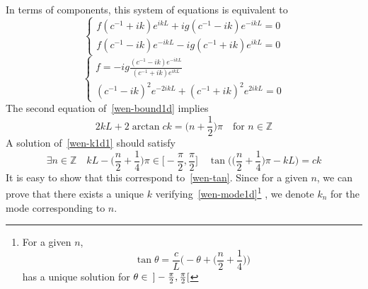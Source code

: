 In terms of components, this system of equations is equivalent to
\begin{equation*}
\begin{cases}
f(c^{-1} + ik)e^{ikL} + ig(c^{-1} - ik)e^{-ikL} = 0 \\
f(c^{-1} - ik)e^{-ikL} - ig(c^{-1}+ ik) e^{ikL} = 0
\end{cases}
\end{equation*}
\ie
\begin{equation}\label{wen-bound1d}
\begin{cases}
f = -ig \frac{(c^{-1} - ik)e^{-ikL}}{(c^{-1} + ik) e^{ikL}} \\
%
(c^{-1} - ik)^2 e^{-2ikL} + (c^{-1}+ik)^2 e^{2ikL} = 0
\end{cases}
\end{equation}
The second equation of~\cref{wen-bound1d} implies
\begin{equation}\label{wen-k1d1}
2kL + 2\arctan{ck} = \big( n +\frac 1 2 \big) \pi \quad\textrm{for $n \in \mathbb Z$}
\end{equation}
A solution of~\cref{wen-k1d1} should satisfy
\begin{equation}\label{wen-mode1d}
\exists n\in \mathbb{Z}\quad
kL - \big(\frac{n}{2} + \frac 1 4 \big) \pi \in \big[-\frac{\pi}{2}, \frac{\pi}{2}\big] \quad
\tan\Big( \big(\frac{n}{2}+\frac 1 4 \big)\pi -kL \Big) = ck
\end{equation}
It is easy to show that this correspond to~\cref{wen-tan}.
Since for a given $n$, we can prove that there exists a unique $k$ verifying~\cref{wen-mode1d}\footnote{
For a given $n$, 
\begin{equation*}
\tan \theta = \frac c L \Big( -\theta + \big( \frac n 2 + \frac 1 4 \big)\Big)
\end{equation*}
has a unique solution for $\theta \in \enskip] -\frac{\pi}{2}, \frac{\pi}{2}[$
}
, we denote $k_n$ for the mode corresponding to $n$.







